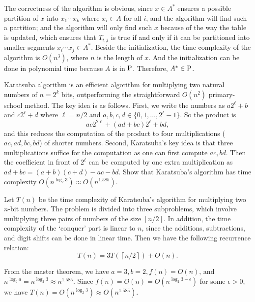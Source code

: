 \documentclass{homework}
\begin{document}
\begin{solution}
  The correctness of the algorithm is obvious, since $x \in A^*$
  ensures a possible partition of $x$ into $x_1 \cdots x_k$ where
  $x_i \in A$ for all $i$, and the algorithm will find such a partition;
  and the algorithm will only find such $x$
  because of the way the table is updated,
  which ensures that $T_{i, j}$ is true
  if and only if it can be partitioned into smaller segments
  $x_i \cdots x_j \in A^*$.
  Beside the initialization,
  the time complexity of the algorithm is $O(n^{3})$,
  where $n$ is the length of $x$.
  And the initialization can be done in polynomial time
  because $A$ is in $\P$.
  Therefore, $A^{*} \in \P$.

\end{solution}

\begin{problem}
  Karatsuba algorithm is an efficient algorithm for multiplying two natural
  numbers of $n = 2^{k}$ bits, outperforming the straightforward $O(n^{2})$
  primary-school method.
  The key idea is as follows.
  First, we write the numbers as $a 2^{\ell} + b$ and $c 2^{\ell} + d$ where
  $\ell = n/2$ and $a, b, c, d \in \{0, 1, \ldots, 2^{\ell}-1\}$.
  So the product is
  \begin{equation*}
    ac2^{2\ell} + (ad+bc) 2^{\ell} + bd,
  \end{equation*}
  and this reduces the computation of the product to four multiplications
  ($ac, ad, bc, bd$) of shorter numbers.
  Second, Karatsuba's key idea is that three multiplications suffice for the
  computation as one can first compute $ac, bd$.
  Then the coefficient in front of $2^{\ell}$ can be computed by one extra
  multiplication as $ad+bc = (a+b)(c+d) - ac -bd$.
  Show that Karatsuba's algorithm has time complexity
  $O(n^{\log_{2} 3}) \approx O(n^{1.585})$.
\end{problem}

\begin{solution}

  Let $T(n)$ be the time complexity of Karatsuba's algorithm for multiplying two
  $n$-bit numbers. The problem is divided into three subproblems,
  which involve multiplying three pairs of numbers of
  the size $\left\lceil n/2\right\rceil$.
  In addition, the time complexity of the `conquer' part is linear to $n$,
  since the additions, subtractions,
  and digit shifts can be done in linear time.
  Then we have the following recurrence relation:
  \begin{equation*}
    T(n) = 3T(\left\lceil n/2\right\rceil) + O(n).
  \end{equation*}
  
  From the master theorem, we have $a = 3, b = 2, f(n) = O(n)$, and
  $n^{\log_{b} a} = n^{\log_{2} 3} \approx n^{1.585}$.
  Since $f(n) = O(n) = O(n^{\log_{2} 3-\epsilon})$ for some $\epsilon > 0$,
  we have $T(n) = O(n^{\log_{2} 3}) \approx O(n^{1.585})$.

\end{solution}
\end{document}
